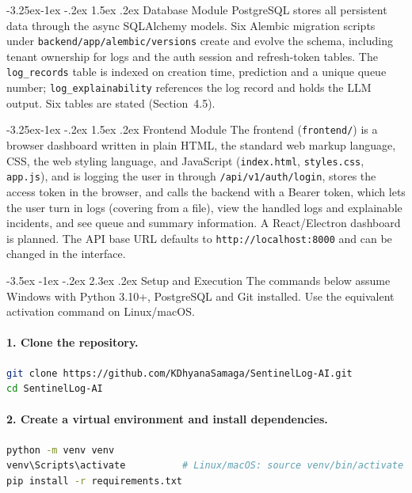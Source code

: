 \documentclass[12pt,a4paper]{report}
\makeatletter
\renewcommand\section{\@startsection {section}{1}{\z@}%
  {-3.5ex \@plus -1ex \@minus -.2ex}%
  {2.3ex \@plus .2ex}%
  {\normalfont\fontsize{17}{21}\selectfont\bfseries}}
\renewcommand\subsection{\@startsection{subsection}{2}{\z@}%
  {-3.25ex\@plus -1ex \@minus -.2ex}%
  {1.5ex \@plus .2ex}%
  {\normalfont\fontsize{12}{18}\selectfont\bfseries}}
\makeatother
\begin{document}
\subsection{Database Module}
PostgreSQL stores all persistent data through the async SQLAlchemy models. Six Alembic migration scripts under \texttt{backend/app/alembic/versions} create and evolve the schema, including tenant ownership for logs and the auth session and refresh-token tables. The \texttt{log\_records} table is indexed on creation time, prediction and a unique queue number; \texttt{log\_explainability} references the log record and holds the LLM output. Six tables are stated (Section~4.5).

\subsection{Frontend Module}
The frontend (\texttt{frontend/}) is a browser dashboard written in plain HTML, the standard web markup language, CSS, the web styling language, and JavaScript (\texttt{index.html}, \texttt{styles.css}, \texttt{app.js}), and is logging the user in through \texttt{/api/v1/auth/login}, stores the access token in the browser, and calls the backend with a Bearer token, which lets the user turn in logs (covering from a file), view the handled logs and explainable incidents, and see queue and summary information. A React/Electron dashboard is planned. The API base URL defaults to \texttt{http://localhost:8000} and can be changed in the interface.

\section{Setup and Execution}
The commands below assume Windows with Python 3.10+, PostgreSQL and Git installed. Use the equivalent activation command on Linux/macOS.

\paragraph{1. Clone the repository.}
\begin{lstlisting}[language=bash]
git clone https://github.com/KDhyanaSamaga/SentinelLog-AI.git
cd SentinelLog-AI
\end{lstlisting}

\paragraph{2. Create a virtual environment and install dependencies.}
\begin{lstlisting}[language=bash]
python -m venv venv
venv\Scripts\activate          # Linux/macOS: source venv/bin/activate
pip install -r requirements.txt
\end{lstlisting}
\end{document}
